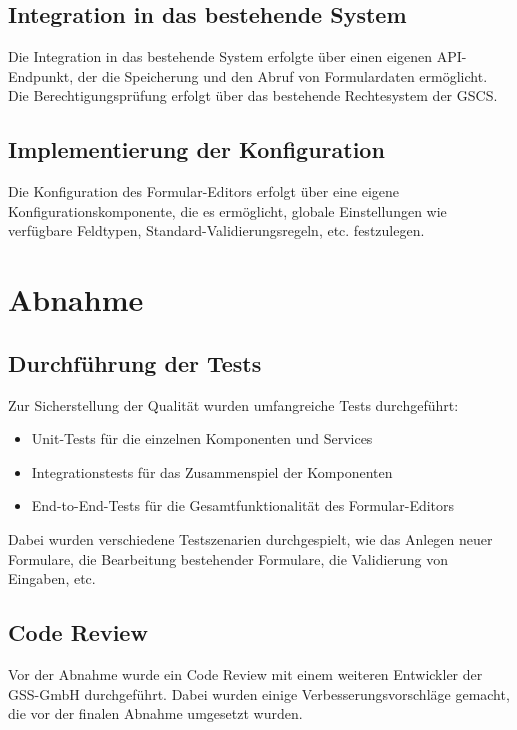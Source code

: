 \documentclass[a4paper,11pt]{article}
\begin{document}
\subsection{Integration in das bestehende System}

Die Integration in das bestehende System erfolgte über einen eigenen API-Endpunkt, der die Speicherung und den Abruf von Formulardaten ermöglicht. Die Berechtigungsprüfung erfolgt über das bestehende Rechtesystem der GSCS.

\subsection{Implementierung der Konfiguration}

Die Konfiguration des Formular-Editors erfolgt über eine eigene Konfigurationskomponente, die es ermöglicht, globale Einstellungen wie verfügbare Feldtypen, Standard-Validierungsregeln, etc. festzulegen.

\section{Abnahme}

\subsection{Durchführung der Tests}

Zur Sicherstellung der Qualität wurden umfangreiche Tests durchgeführt:

\begin{itemize}
\item Unit-Tests für die einzelnen Komponenten und Services
\item Integrationstests für das Zusammenspiel der Komponenten
\item End-to-End-Tests für die Gesamtfunktionalität des Formular-Editors
\end{itemize}

Dabei wurden verschiedene Testszenarien durchgespielt, wie das Anlegen neuer Formulare, die Bearbeitung bestehender Formulare, die Validierung von Eingaben, etc.

\subsection{Code Review}

Vor der Abnahme wurde ein Code Review mit einem weiteren Entwickler der GSS-GmbH durchgeführt. Dabei wurden einige Verbesserungsvorschläge gemacht, die vor der finalen Abnahme umgesetzt wurden.
\end{document}
